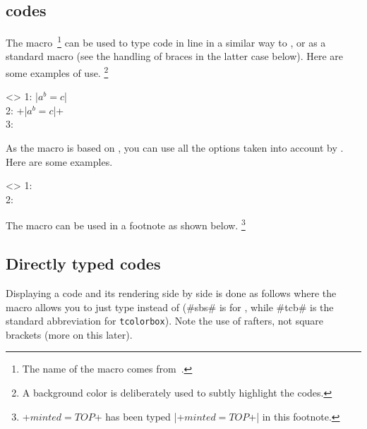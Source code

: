\subsection{ codes}
\label{tutodoc-listing-latex-inline}

\begin{tdocexa}
    The  macro\,%
    \footnote{
        The name of the macro  comes from \,.
    }
    can be used to type code in line in a similar way to , or as a standard macro (see the handling of braces in the latter case below).
    Here are some examples of use.%
    \footnote{
    	A background color is deliberately used to subtly highlight the \tdoclatexin{\LaTeX} codes.
    }

    \begin{tdoclatex}<>
1: \tdoclatexin|$a^b = c$|               \\
2: \tdoclatexin+\tdoclatexin|$a^b = c$|+ \\
3: 
	\end{tdoclatex}
\end{tdocexa}


\begin{tdocexa}
    As the  macro is based on , you can use all the options taken into account by .
    Here are some examples.

    \begin{tdoclatex}<>
1:  \\
2: 
	\end{tdoclatex}
\end{tdocexa}


\begin{tdocnote}
	The  macro can be used in a footnote as shown below.%
    \footnote{
        \tdoclatexin+$minted = TOP$+ has been typed \tdoclatexin|\tdoclatexin+$minted = TOP$+| in this footnote.
    }
\end{tdocnote}


\subsection{Directly typed codes}

\begin{tdocexa}
    Displaying a code and its rendering side by side is done as follows where the macro  allows you to just type  instead of  (\tdoclatexin#sbs# is for , while \tdoclatexin#tcb# is the standard abbreviation for \texttt{tcolorbox}). Note the use of rafters, not square brackets (more on this later).

\end{tdocexa}


